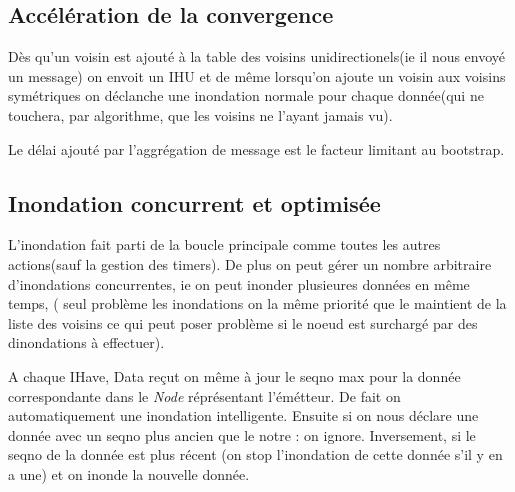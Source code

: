 \documentclass{report}
\begin{document}
\subsection{Accélération de la convergence}
Dès qu'un voisin est ajouté à la table des voisins unidirectionels(ie il nous envoyé un message) on envoit un IHU et de même lorsqu'on ajoute un voisin aux voisins 
symétriques on déclanche une inondation normale pour chaque donnée(qui ne touchera, par algorithme, que les voisins ne l'ayant jamais vu).

Le délai ajouté par l'aggrégation de message est le facteur limitant au bootstrap. 

\subsection{Inondation concurrent et optimisée}
L'inondation fait parti de la boucle principale comme toutes les autres actions(sauf la gestion des timers). De plus on peut gérer un nombre arbitraire d'inondations concurrentes, 
ie on peut inonder plusieures données en même temps, 
( seul problème les inondations on la même priorité que le maintient de la liste des voisins ce qui peut poser problème si le noeud est surchargé par des dinondations à effectuer).

A chaque IHave, Data reçut on même à jour le seqno max pour la donnée correspondante dans le \textit{Node} réprésentant l'émétteur. De fait on automatiquement une inondation intelligente.
Ensuite si on nous déclare une donnée avec un seqno plus ancien que le notre : on ignore. Inversement, si le seqno de la donnée est plus récent (on stop l'inondation de cette donnée s'il y 
en a une) et on inonde la nouvelle donnée.
\end{document}
